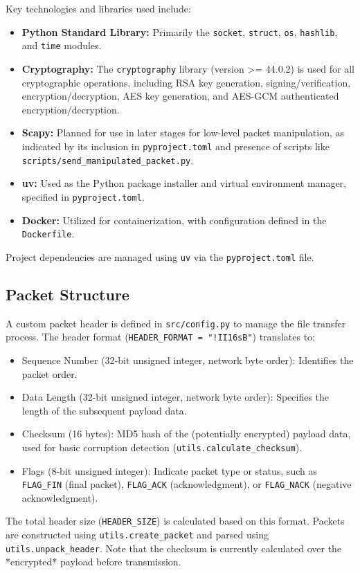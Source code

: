 \documentclass[11pt]{article}
\begin{document}
Key technologies and libraries used include:
\begin{itemize}
    \item \textbf{Python Standard Library:} Primarily the \texttt{socket}, \texttt{struct}, \texttt{os}, \texttt{hashlib}, and \texttt{time} modules.
    \item \textbf{Cryptography:} The \texttt{cryptography} library (version >= 44.0.2) is used for all cryptographic operations, including RSA key generation, signing/verification, encryption/decryption, AES key generation, and AES-GCM authenticated encryption/decryption.
    \item \textbf{Scapy:} Planned for use in later stages for low-level packet manipulation, as indicated by its inclusion in \texttt{pyproject.toml} and presence of scripts like \texttt{scripts/send\_manipulated\_packet.py}.
    \item \textbf{uv:} Used as the Python package installer and virtual environment manager, specified in \texttt{pyproject.toml}.
    \item \textbf{Docker:} Utilized for containerization, with configuration defined in the \texttt{Dockerfile}.
\end{itemize}
Project dependencies are managed using \texttt{uv} via the \texttt{pyproject.toml} file.

\subsection{Packet Structure}
\label{sec:packet_structure}
A custom packet header is defined in \texttt{src/config.py} to manage the file transfer process. The header format (\texttt{HEADER\_FORMAT = "!II16sB"}) translates to:
\begin{itemize}
    \item Sequence Number (32-bit unsigned integer, network byte order): Identifies the packet order.
    \item Data Length (32-bit unsigned integer, network byte order): Specifies the length of the subsequent payload data.
    \item Checksum (16 bytes): MD5 hash of the (potentially encrypted) payload data, used for basic corruption detection (\texttt{utils.calculate\_checksum}).
    \item Flags (8-bit unsigned integer): Indicate packet type or status, such as \texttt{FLAG\_FIN} (final packet), \texttt{FLAG\_ACK} (acknowledgment), or \texttt{FLAG\_NACK} (negative acknowledgment).
\end{itemize}
The total header size (\texttt{HEADER\_SIZE}) is calculated based on this format. Packets are constructed using \texttt{utils.create\_packet} and parsed using \texttt{utils.unpack\_header}. Note that the checksum is currently calculated over the *encrypted* payload before transmission.
\end{document}
